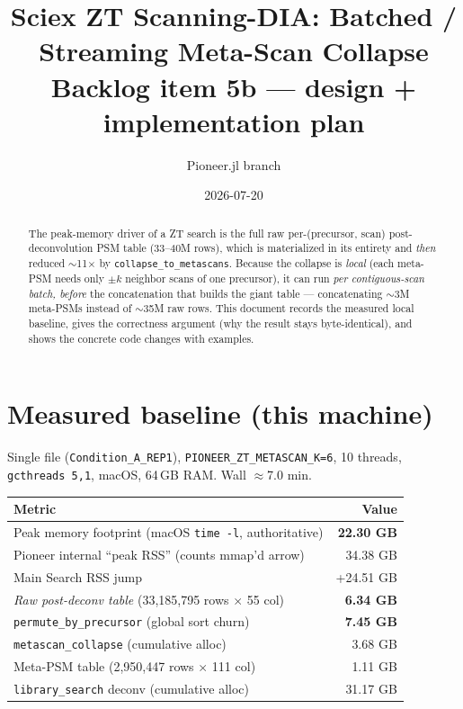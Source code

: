 \documentclass[11pt]{article}
\title{\textbf{Sciex ZT Scanning-DIA: Batched / Streaming Meta-Scan Collapse}\\[2pt]
\large Backlog item 5b --- design + implementation plan}
\author{Pioneer.jl \quad branch \code{feat/sciex-zt-scanning}}
\date{2026-07-20}
\newcommand{\code}[1]{\texttt{\small #1}}
\begin{document}
\maketitle

\begin{abstract}
The peak-memory driver of a ZT search is the full raw per-(precursor, scan)
post-deconvolution PSM table (33--40M rows), which is materialized in its
entirety and \emph{then} reduced $\sim$11$\times$ by \code{collapse\_to\_metascans}.
Because the collapse is \emph{local} (each meta-PSM needs only $\pm k$ neighbor
scans of one precursor), it can run \emph{per contiguous-scan batch, before} the
concatenation that builds the giant table --- concatenating $\sim$3M meta-PSMs
instead of $\sim$35M raw rows. This document records the measured local baseline,
gives the correctness argument (why the result stays byte-identical), and shows
the concrete code changes with examples.
\end{abstract}

\section{Measured baseline (this machine)}
Single file (\code{Condition\_A\_REP1}), \code{PIONEER\_ZT\_METASCAN\_K=6}, 10 threads,
\code{gcthreads 5,1}, macOS, 64\,GB RAM. Wall $\approx$7.0 min.

\begin{center}
\begin{tabular}{lr}
\toprule
Metric & Value \\
\midrule
Peak memory footprint (macOS \code{time -l}, authoritative) & \textbf{22.30 GB} \\
Pioneer internal ``peak RSS'' (counts mmap'd arrow) & 34.38 GB \\
Main Search RSS jump & +24.51 GB \\
\midrule
\emph{Raw post-deconv table} (33{,}185{,}795 rows $\times$ 55 col) & \textbf{6.34 GB} \\
\code{permute\_by\_precursor} (global sort churn) & \textbf{7.45 GB} \\
\code{metascan\_collapse} (cumulative alloc) & 3.68 GB \\
Meta-PSM table (2{,}950{,}447 rows $\times$ 111 col) & 1.11 GB \\
\code{library\_search} deconv (cumulative alloc) & 31.17 GB \\
\bottomrule
\end{tabular}
\end{center}
\end{document}
